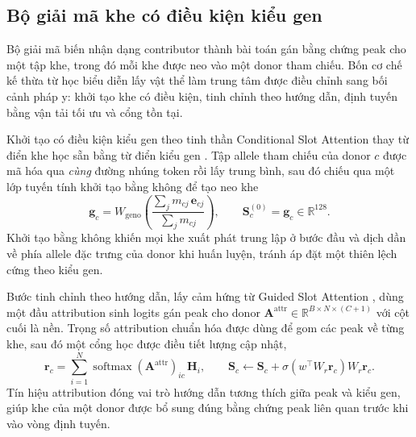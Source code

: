 \documentclass[12pt,a4paper]{article}
\begin{document}
\subsection{Bộ giải mã khe có điều kiện kiểu gen}

Bộ giải mã biến nhận dạng contributor thành bài toán gán bằng chứng peak cho một tập khe, trong đó mỗi khe được neo vào một donor tham chiếu. Bốn cơ chế kế thừa từ học biểu diễn lấy vật thể làm trung tâm được điều chỉnh sang bối cảnh pháp y: khởi tạo khe có điều kiện, tinh chỉnh theo hướng dẫn, định tuyến bằng vận tải tối ưu và cổng tồn tại.

Khởi tạo có điều kiện kiểu gen theo tinh thần Conditional Slot Attention thay từ điển khe học sẵn bằng từ điển kiểu gen \cite{ma2024cosa}. Tập allele tham chiếu của donor \(c\) được mã hóa qua \emph{cùng} đường nhúng token rồi lấy trung bình, sau đó chiếu qua một lớp tuyến tính khởi tạo bằng không để tạo neo khe
\begin{equation}
\bm{g}_c=W_{\mathrm{geno}}\!\left(\frac{\sum_j m_{cj}\,\bm{e}_{cj}}{\sum_j m_{cj}}\right),
\qquad \bm{S}^{(0)}_c=\bm{g}_c\in\mathbb{R}^{128}.
\end{equation}
Khởi tạo bằng không khiến mọi khe xuất phát trung lập ở bước đầu và dịch dần về phía allele đặc trưng của donor khi huấn luyện, tránh áp đặt một thiên lệch cứng theo kiểu gen.

Bước tinh chỉnh theo hướng dẫn, lấy cảm hứng từ Guided Slot Attention \cite{lee2024gsa}, dùng một đầu attribution sinh logits gán peak cho donor \(\bm{A}^{\mathrm{attr}}\in\mathbb{R}^{B\times N\times(C+1)}\) với cột cuối là nền. Trọng số attribution chuẩn hóa được dùng để gom các peak về từng khe, sau đó một cổng học được điều tiết lượng cập nhật,
\begin{equation}
\bm{r}_c=\sum_{i=1}^{N}\operatorname{softmax}(\bm{A}^{\mathrm{attr}})_{ic}\,\mathbf{H}_i,
\qquad
\bm{S}_c\leftarrow\bm{S}_c+\sigma\!\left(w^\top W_{r}\bm{r}_c\right)W_{r}\bm{r}_c.
\end{equation}
Tín hiệu attribution đóng vai trò hướng dẫn tương thích giữa peak và kiểu gen, giúp khe của một donor được bổ sung đúng bằng chứng peak liên quan trước khi vào vòng định tuyến.
\end{document}
